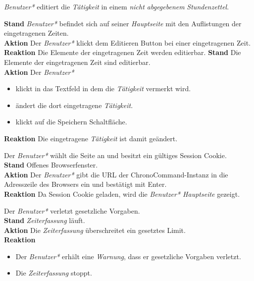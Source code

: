 \begin{requirements}
	 \emph{Benutzer*} editiert die \emph{Tätigkeit} in einem \emph{nicht abgegebenem} \emph{Stundenzettel}.
	\begin{requirements}
	        \textbf{Stand} \emph{Benutzer*} befindet sich auf seiner \emph{Hauptseite} mit den Auflistungen der eingetragenen Zeiten. \\
	        \textbf{Aktion} Der \emph{Benutzer*} klickt dem Editieren Button bei einer eingetragenen Zeit.\\
            \textbf{Reaktion} Die Elemente der eingetragenen Zeit werden editierbar.
        \textbf{Stand} Die Elemente der eingetragenen Zeit sind editierbar. \\
        \textbf{Aktion} Der \emph{Benutzer*}
            \begin{itemize}
                \item klickt in das Textfeld in dem die \emph{Tätigkeit} vermerkt wird.
                \item ändert die dort eingetragene \emph{Tätigkeit}.
                \item klickt auf die Speichern Schaltfläche.
            \end{itemize}
            \textbf{Reaktion} Die eingetragene \emph{Tätigkeit} ist damit geändert.
    \end{requirements}

     Der \emph{Benutzer*} wählt die Seite an und besitzt ein gültiges Session Cookie. \\
        \textbf{Stand} Offenes Browserfenster. \\
        \textbf{Aktion} Der \emph{Benutzer*} gibt die URL der ChronoCommand-Instanz in die Adresszeile des Browsers ein und bestätigt mit Enter. \\
        \textbf{Reaktion} Da Session Cookie geladen, wird die \emph{Benutzer* Hauptseite} gezeigt.

     Der \emph{Benutzer*} verletzt gesetzliche Vorgaben. \\
        \textbf{Stand} \emph{Zeiterfassung} läuft. \\
        \textbf{Aktion} Die \emph{Zeiterfassung} überschreitet ein gesetztes Limit. \\
        \textbf{Reaktion}
            \begin{itemize}
                \item Der \emph{Benutzer*} erhält eine \emph{Warnung}, dass er gesetzliche Vorgaben verletzt.
                \item Die \emph{Zeiterfassung} stoppt.
            \end{itemize}


\end{requirements}
